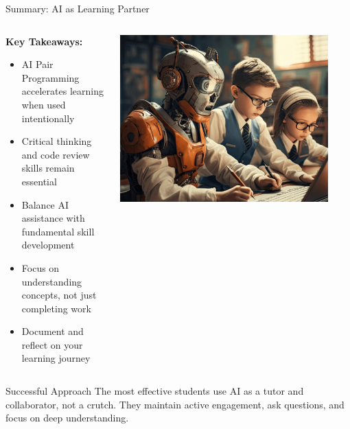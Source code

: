 \documentclass{beamer}
\begin{document}
\begin{frame}[t]{Summary: AI as Learning Partner}
    \begin{columns}
        \begin{column}{0.6\textwidth}
            \textbf{Key Takeaways:}
            \begin{itemize}
                \item AI Pair Programming accelerates learning when used intentionally
                \item Critical thinking and code review skills remain essential
                \item Balance AI assistance with fundamental skill development
                \item Focus on understanding concepts, not just completing work
                \item Document and reflect on your learning journey
            \end{itemize}
        \end{column}
        \begin{column}{0.4\textwidth}
            \centering
            \includegraphics[width=0.9\textwidth]{images/ai-learning-partner.png}
        \end{column}
    \end{columns}
    
    \vspace{0.5cm}
    \begin{block}{Successful Approach}
        The most effective students use AI as a tutor and collaborator, not a crutch. They maintain active engagement, ask questions, and focus on deep understanding.
    \end{block}
\end{frame}
\end{document}
